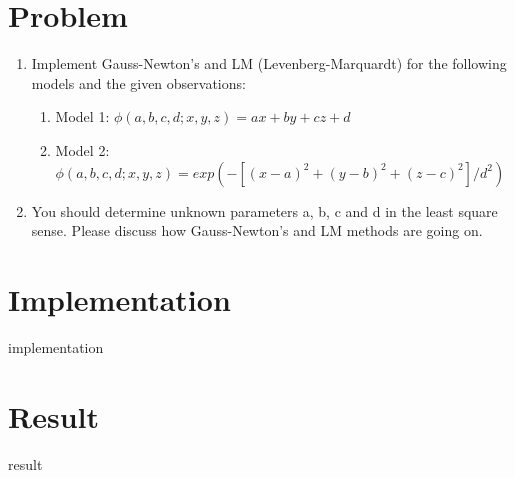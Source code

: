 \documentclass[12pt,letterpaper]{article}
\begin{document}
\section*{Problem}

\begin{enumerate}
  \item Implement Gauss-Newton's and LM (Levenberg-Marquardt) for the following models and the given observations:
  \begin{enumerate}
    \item Model 1: $\phi(a, b, c, d; x, y, z) = ax + by + cz + d$
    \item Model 2: $\phi(a, b, c, d; x, y, z) = exp(-[(x-a)^2+(y-b)^2+(z-c)^2]/d^2)$
  \end{enumerate}
  \item You should determine unknown parameters a, b, c and d in the least square sense. Please discuss how Gauss-Newton's and LM methods are going on.
\end{enumerate}

\section*{Implementation}
{implementation}

\newpage
\section*{Result}
{result}
\end{document}
